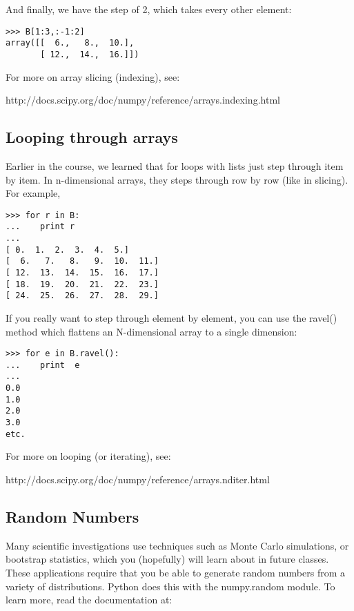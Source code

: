 {\noindent And finally, we have the step of 2, which takes every other element:

{\singlespacing \color{blue} \begin{verbatim}
>>> B[1:3,:-1:2] 
array([[  6.,   8.,  10.],
       [ 12.,  14.,  16.]])
\end{verbatim}}

\noindent For more on array slicing (indexing), see:

http://docs.scipy.org/doc/numpy/reference/arrays.indexing.html




\subsection{Looping through arrays}

 Earlier in the course, we learned that  {\color{blue} for} loops with lists  just step through item by item.  In n-dimensional arrays, they steps through row by row (like in slicing).  For example, 
 

{\singlespacing \color{blue} \begin{verbatim}
>>> for r in B:
...    print r
... 
[ 0.  1.  2.  3.  4.  5.]
[  6.   7.   8.   9.  10.  11.]
[ 12.  13.  14.  15.  16.  17.]
[ 18.  19.  20.  21.  22.  23.]
[ 24.  25.  26.  27.  28.  29.]
\end{verbatim}}

If you really want to step through element by element, you can use the {\color{blue}ravel()} method which flattens an N-dimensional array to a single dimension:

{\singlespacing \color{blue} \begin{verbatim}
>>> for e in B.ravel():
...    print  e
... 
0.0
1.0
2.0
3.0
etc.
\end{verbatim}}

For more on looping (or iterating), see:

http://docs.scipy.org/doc/numpy/reference/arrays.nditer.html

\subsection{Random Numbers}

Many scientific investigations use techniques such as Monte Carlo simulations, or bootstrap statistics, which you (hopefully) will learn about in future classes.  These applications require that you be able to generate random numbers from a variety of distributions.  Python does this with the {\color{blue}numpy.random} module.  To learn more, read the documentation at:

}
